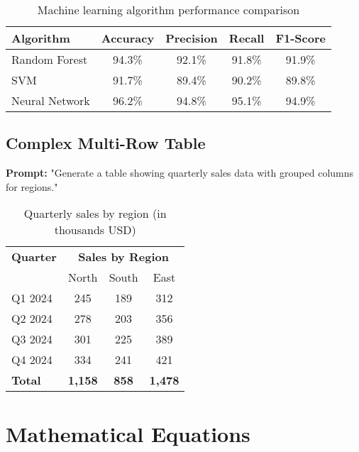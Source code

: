 \documentclass[12pt, a4paper]{article}
\begin{document}
\begin{table}[h]
    \centering
    \caption{Machine learning algorithm performance comparison}
    \label{tab:ml_comparison}
    \begin{tabular}{lcccc}
        \toprule
        \textbf{Algorithm} & \textbf{Accuracy} & \textbf{Precision} & \textbf{Recall} & \textbf{F1-Score} \\
        \midrule
        Random Forest & 94.3\% & 92.1\% & 91.8\% & 91.9\% \\
        SVM & 91.7\% & 89.4\% & 90.2\% & 89.8\% \\
        Neural Network & 96.2\% & 94.8\% & 95.1\% & 94.9\% \\
        \bottomrule
    \end{tabular}
\end{table}

\subsection{Complex Multi-Row Table}

\textbf{Prompt:} "Generate a table showing quarterly sales data with grouped columns for regions."

\begin{table}[h]
    \centering
    \caption{Quarterly sales by region (in thousands USD)}
    \label{tab:sales}
    \begin{tabular}{lccc}
        \toprule
        \textbf{Quarter} & \multicolumn{3}{c}{\textbf{Sales by Region}} \\
        \cmidrule(lr){2-4}
         & North & South & East \\
        \midrule
        Q1 2024 & 245 & 189 & 312 \\
        Q2 2024 & 278 & 203 & 356 \\
        Q3 2024 & 301 & 225 & 389 \\
        Q4 2024 & 334 & 241 & 421 \\
        \midrule
        \textbf{Total} & \textbf{1,158} & \textbf{858} & \textbf{1,478} \\
        \bottomrule
    \end{tabular}
\end{table}

\section{Mathematical Equations}
\end{document}
